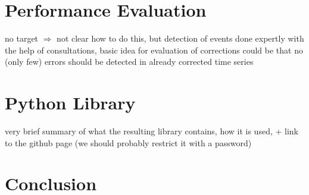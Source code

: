 \documentclass[12pt,a4paper]{article}
\begin{document}
\section{Performance Evaluation}
no target $\Rightarrow$ not clear how to do this, but detection of events done expertly with the help of consultations,  basic idea for evaluation of corrections could be that no (only few) errors should be detected in already corrected time series 


\section{Python Library}

very brief summary of what the resulting library contains, how it is used, + link to the github page (we should probably restrict it with a password)






\section{Conclusion}
\end{document}
